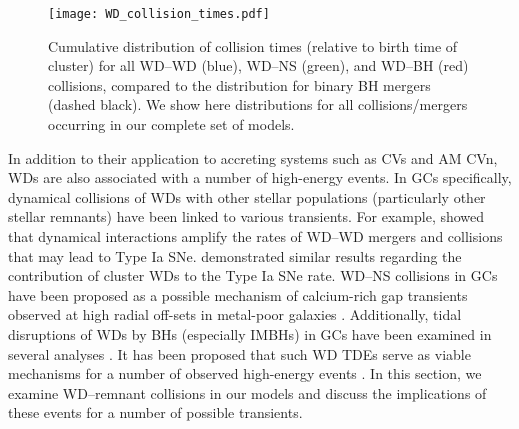 \documentclass[twocolumn,tighten]{aastex63}
\begin{document}
\begin{figure}
\begin{center}
\texttt{[image: WD\_collision\_times.pdf]}
\caption{\footnotesize \label{fig:WD_collision_times} Cumulative distribution of collision times (relative to birth time of cluster) for all WD--WD (blue), WD--NS (green), and WD--BH (red) collisions, compared to the distribution for binary BH mergers (dashed black). We show here distributions for all collisions/mergers occurring in our complete set of models.}
\end{center}
\end{figure}

In addition to their application to accreting systems such as CVs and AM CVn, WDs are also associated with a number of high-energy events.
In GCs specifically, dynamical collisions of WDs with other stellar populations (particularly other stellar remnants) have been linked to various transients. For example, \citet{SharaHurley2002} showed that dynamical interactions amplify the rates of WD--WD mergers and collisions that may lead to Type Ia SNe. \citet{Ivanova2006} demonstrated similar results regarding the contribution of cluster WDs to the Type Ia SNe rate. WD--NS collisions in GCs have been proposed as a possible mechanism of calcium-rich gap transients observed at high radial off-sets in metal-poor galaxies \citep{Kasliwal2012,Lunnan2017,De2018,Shen2019}. Additionally, tidal disruptions of WDs by BHs (especially IMBHs) in GCs have been examined in several analyses \citep{Rosswog2009,MacLeod2016,Fragleiginskoc2018}. It has been proposed that such WD TDEs serve as viable mechanisms for a number of observed high-energy events \citep[e.g.,][]{Krolik2011,Jonker2013}. In this section, we examine WD--remnant collisions in our models and discuss the implications of these events for a number of possible transients.
\end{document}
